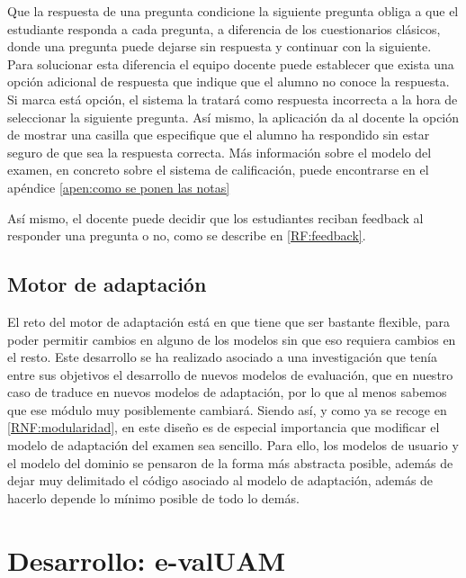 Que la respuesta de una pregunta condicione la siguiente pregunta obliga a que el estudiante responda a cada pregunta, a diferencia de los cuestionarios clásicos, donde una pregunta puede dejarse sin respuesta y continuar con la siguiente. Para solucionar esta diferencia el equipo docente puede establecer que exista una opción adicional de respuesta que indique que el alumno no conoce la respuesta. Si marca está opción, el sistema la tratará como respuesta incorrecta a la hora de seleccionar la siguiente pregunta. Así mismo, la aplicación da al docente la opción de mostrar una casilla que especifique que el alumno ha respondido sin estar seguro de que sea la respuesta correcta. Más información sobre el modelo del examen, en concreto sobre el sistema de calificación, puede encontrarse en el apéndice \ref{apen:como se ponen las notas}

Así mismo, el docente puede decidir que los estudiantes reciban feedback al responder una pregunta o no, como se describe en \ref{RF:feedback}.


\subsection{Motor de adaptación}

El reto del motor de adaptación está en que tiene que ser bastante flexible, para poder permitir cambios en alguno de los modelos sin que eso requiera cambios en el resto. Este desarrollo se ha realizado asociado a una investigación que tenía entre sus objetivos el desarrollo de nuevos modelos de evaluación, que en nuestro caso de traduce en nuevos modelos de adaptación, por lo que al menos sabemos que ese módulo muy posiblemente cambiará. Siendo así, y como ya se recoge en \ref{RNF:modularidad}, en este diseño es de especial importancia que modificar el modelo de adaptación del examen sea sencillo. Para ello, los modelos de usuario y el modelo del dominio se pensaron de la forma más abstracta posible, además de dejar muy delimitado el código asociado al modelo de adaptación, además de hacerlo depende lo mínimo posible de todo lo demás.



\section{Desarrollo: e-valUAM\label{sec:desarrollo}}

